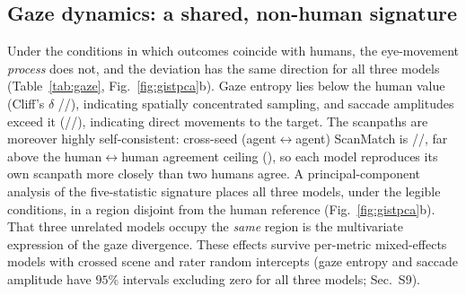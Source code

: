 \documentclass[runningheads]{llncs}
\begin{document}
\vspace{-5mm}
\subsection{Gaze dynamics: a shared, non-human signature}
\label{sec:gaze}
 \vspace{-1mm}
Under the conditions in which outcomes coincide with humans, the eye-movement \emph{process} does not, and
the deviation has the same direction for all three models (Table~\ref{tab:gaze}, Fig.~\ref{fig:gistpca}b).
Gaze entropy lies below the human value (Cliff's $\delta$ \QwenGPEntropyD/\GlmGPEntropyD/\GemmaGPEntropyD),
indicating spatially concentrated sampling, and saccade amplitudes exceed it
(\QwenGPSaccD/\GlmGPSaccD/\GemmaGPSaccD), indicating direct movements to the target. The scanpaths are
moreover highly self-consistent: cross-seed (agent$\leftrightarrow$agent) ScanMatch is
\QwenGPSelfConsist/\GlmGPSelfConsist/\GemmaGPSelfConsist, far above the human$\leftrightarrow$human
agreement ceiling (\HumanCeiling), so each model reproduces its own scanpath more closely than two humans
agree. A principal-component analysis of the five-statistic signature places all three models, under the
legible conditions, in a region disjoint from the human reference (Fig.~\ref{fig:gistpca}b). That three
unrelated models occupy the \emph{same} region is the multivariate expression of the gaze divergence. These effects survive per-metric mixed-effects models with crossed scene and rater random intercepts (gaze entropy and saccade amplitude have $95\%$ intervals excluding zero for all three models; Sec.~S9).
 
\begin{table}[!tb]\centering
\caption{Gaze axis at the human-matched condition: Cliff's $\delta$ against the human distribution
($|\delta|>0.33$ in bold; sign is agent $-$ human) and cross-seed self-consistency. The deviation is non-human and shares a
common direction across models (sub-threshold for Gemma-4-E4B on entropy and amplitude), whereas center
bias, the spatial prior, is human-like (sub-threshold) for all three. Full seven-statistic Cliff's $\delta$ (all conditions): Table~S3.}
\label{tab:gaze}

 \vspace{-5mm}
\end{table}
 
\end{document}
